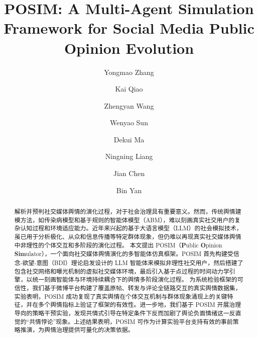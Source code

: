 \documentclass[a4paper,fleqn]{cas-dc}
\begin{document}
\let\WriteBookmarks\relax
\def\floatpagepagefraction{1}
\def\textpagefraction{.001}


\title [mode = title]{POSIM: A Multi-Agent Simulation Framework for Social Media Public Opinion Evolution}

\author{Yongmao Zhang}

\author{Kai Qiao}

\author{Zhengyan Wang}

\author{Wenyao Sun}

\author{Dekui Ma}

\author{Ningning Liang}

\author{Jian Chen}

\author{Bin Yan}
\cormark[1]



\begin{abstract}
解析并预判社交媒体舆情的演化过程，对于社会治理具有重要意义。然而，传统舆情建模方法，如传染病模型和基于规则的智能体模型（ABM），难以刻画真实社交用户的复杂认知过程和环境适应能力。近年来兴起的基于大语言模型（LLM）的社会模拟技术，虽已用于分析极化、从众和信息传播等特定群体现象，但仍难以再现真实社交媒体舆情中非理性的个体交互和多阶段的演化过程。
本文提出 POSIM（\textbf{P}ublic \textbf{O}pinion \textbf{Sim}ulator），一个面向社交媒体舆情演化的多智能体仿真框架。POSIM 首先构建受信念-欲望-意图（BDI）理论启发设计的 LLM 智能体来模拟非理性社交用户，然后搭建了包含社交网络和曝光机制的虚拟社交媒体环境，最后引入基于点过程的时间动力学引擎，以统一刻画智能体与环境持续耦合下的舆情多阶段演化过程。
为系统检验框架的可信性，我们基于微博平台构建了覆盖原帖、转发与评论全链路交互的真实舆情数据集，实验表明，POSIM 成功复现了真实舆情在个体交互机制与群体现象涌现上的关键特征，并在多个舆情指标上验证了框架的有效性。进一步地，我们基于 POSIM 开展治理导向的策略干预实验，发现共情式引导在特定条件下反而加剧了舆论负面情绪这一反直觉的“共情悖论”现象。上述结果表明，POSIM 可作为计算实验平台支持有效的事前策略推演，为舆情治理提供可量化的决策依据。
\end{abstract}
\end{document}

